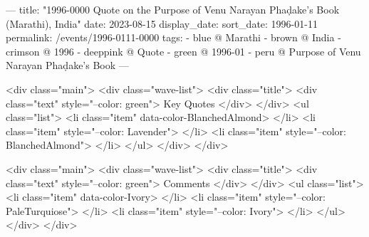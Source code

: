 ---
title: "1996-0000 Quote on the Purpose of Venu Narayan Phaḍake's Book (Marathi), India"
date: 2023-08-15
display_date: 
sort_date: 1996-01-11
permalink: /events/1996-0111-0000
tags:
  - blue @ Marathi
  - brown @ India
  - crimson @ 1996
  - deeppink @ Quote
  - green @ 1996-01
  - peru @ Purpose of Venu Narayan Phaḍake's Book
---

<div class="main">
  <div class="wave-list">
    <div class="title">
      <div class="text" style="--color: green">
        Key Quotes
      </div>
    </div>
    <ul class="list">
        <li class="item" data-color-BlanchedAlmond>
        </li>
        <li class="item" style="--color: Lavender">
        </li>
        <li class="item" style="--color: BlanchedAlmond">
        </li>
      </ul>
  </div>
</div>

<div class="main">
  <div class="wave-list">
    <div class="title">
      <div class="text" style="--color: green">
        Comments
      </div>
    </div>
    <ul class="list">
        <li class="item" data-color-Ivory>
        </li>
        <li class="item" style="--color: PaleTurquiose">
        </li>
        <li class="item" style="--color: Ivory">
        </li>
      </ul>
  </div>
</div>